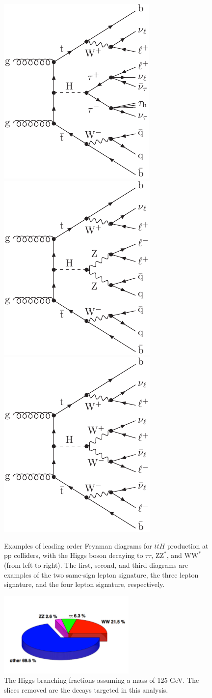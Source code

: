 \begin{figure}[htb]
\centering
\includegraphics[width=0.25\linewidth]{ch2_figs/gg-ttH-tt-2lss.pdf}
\hspace{0.5cm}
\includegraphics[width=0.25\linewidth]{ch2_figs/gg-ttH-ZZ-3l.pdf}
\hspace{0.5cm}
\includegraphics[width=0.25\linewidth]{ch2_figs/gg-ttH-WW-4l.pdf}
\caption[\tth feynman diagrams]{Examples of leading order Feynman diagrams for $t\bar{t}H$ production at pp colliders, with the Higgs boson decaying to
$\tau\tau$, $\mathrm{ZZ}^{*}$, and
$\mathrm{WW}^{*}$ (from left to right). The first, second, and third diagrams are examples of the two same-sign lepton signature,
the three lepton signature, and the four lepton signature, respectively.}
\label{fig:tth_example_diagram}
\end{figure}

\begin{figure}[hbtp]
 \begin{center}
   \includegraphics[width=0.6\textwidth]{ch2_figs/pie.pdf}
   \caption[Pie chart of Higgs branching fractions]{The Higgs branching fractions assuming a mass of 125 GeV. The slices removed are the decays targeted in this analysis.}
   \label{fig:pie}
 \end{center}
\end{figure}

%
% 
% 
